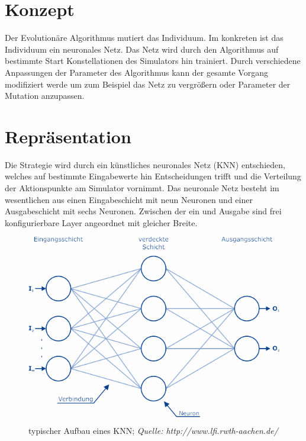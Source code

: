 \section{Konzept}
Der Evolutionäre Algorithmus mutiert das Individuum. Im konkreten ist das Individuum ein neuronales Netz. Das Netz wird durch den Algorithmus auf bestimmte Start Konstellationen des Simulators hin trainiert. Durch verschiedene Anpassungen der Parameter des Algorithmus kann der gesamte Vorgang modifiziert werde um zum Beispiel das Netz zu vergrößern oder Parameter der Mutation anzupassen.

\section{Repräsentation}
Die Strategie wird durch ein künstliches neuronales Netz (KNN) entschieden, welches auf bestimmte Eingabewerte hin Entscheidungen trifft und die Verteilung der Aktionspunkte am Simulator vornimmt. Das neuronale Netz besteht im wesentlichen aus einen Eingabeschicht mit neun Neuronen und einer Ausgabeschicht mit sechs Neuronen. Zwischen der ein und Ausgabe sind frei konfigurierbare Layer angeordnet mit gleicher Breite. 


\begin{figure}[h!]
\begin{center}
\includegraphics[scale=1.5]{images/knn}
\caption{typischer Aufbau eines KNN;\textit{ Quelle: http://www.lfi.rwth-aachen.de/}}
\label{KNN}
\end{center}
\end{figure}

